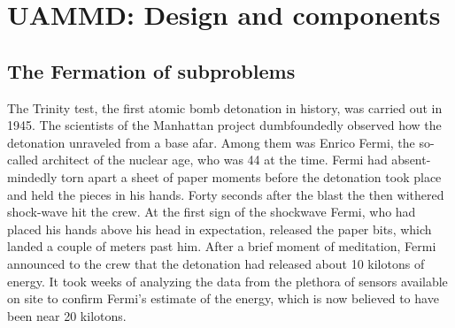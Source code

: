 \documentclass[ twoside,openright,titlepage,numbers=noenddot,%
headinclude,footinclude,cleardoublepage=empty,abstract=on,
BCOR=5mm,paper=b5,fontsize=11pt, dvipsnames
]{scrreprt}
\begin{document}
\part{UAMMD: Design and components}\label{pt:uammd}

\chapter{The Fermation of subproblems}

The Trinity test, the first atomic bomb detonation in history, was carried out in 1945. The scientists of the Manhattan project dumbfoundedly observed how the detonation unraveled from a base afar. Among them was Enrico Fermi, the so-called architect of the nuclear age, who was 44 at the time. Fermi had absent-mindedly torn apart a sheet of paper moments before the detonation took place and held the pieces in his hands. Forty seconds after the blast the then withered shock-wave hit the crew. At the first sign of the shockwave Fermi, who had placed his hands above his head in expectation, released the paper bits, which landed a couple of meters past him. After a brief moment of meditation, Fermi announced to the crew that the detonation had released about 10 kilotons of energy.
It took weeks of analyzing the data from the plethora of sensors available on site to confirm Fermi's estimate of the energy, which is now believed to have been near 20 kilotons.
\end{document}
